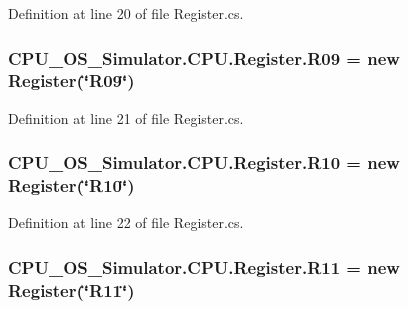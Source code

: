 Definition at line 20 of file Register.\+cs.

\hypertarget{class_c_p_u___o_s___simulator_1_1_c_p_u_1_1_register_a6d88d738c0794179adbe47a73359b769}{}
\subsubsection[{R09}]{ C\+P\+U\+\_\+\+O\+S\+\_\+\+Simulator.\+C\+P\+U.\+Register.\+R09 = new {\bf Register}(\char`\"{}R09\char`\"{})\hspace{0.3cm}{\ttfamily [static]}}\label{class_c_p_u___o_s___simulator_1_1_c_p_u_1_1_register_a6d88d738c0794179adbe47a73359b769}


Definition at line 21 of file Register.\+cs.

\hypertarget{class_c_p_u___o_s___simulator_1_1_c_p_u_1_1_register_aafde355f621c35a2994b26ac1ad8c61b}{}
\subsubsection[{R10}]{ C\+P\+U\+\_\+\+O\+S\+\_\+\+Simulator.\+C\+P\+U.\+Register.\+R10 = new {\bf Register}(\char`\"{}R10\char`\"{})\hspace{0.3cm}{\ttfamily [static]}}\label{class_c_p_u___o_s___simulator_1_1_c_p_u_1_1_register_aafde355f621c35a2994b26ac1ad8c61b}


Definition at line 22 of file Register.\+cs.

\hypertarget{class_c_p_u___o_s___simulator_1_1_c_p_u_1_1_register_a4f593c7d99a4e42966dea3749c07b79d}{}
\subsubsection[{R11}]{ C\+P\+U\+\_\+\+O\+S\+\_\+\+Simulator.\+C\+P\+U.\+Register.\+R11 = new {\bf Register}(\char`\"{}R11\char`\"{})\hspace{0.3cm}{\ttfamily [static]}}\label{class_c_p_u___o_s___simulator_1_1_c_p_u_1_1_register_a4f593c7d99a4e42966dea3749c07b79d}


